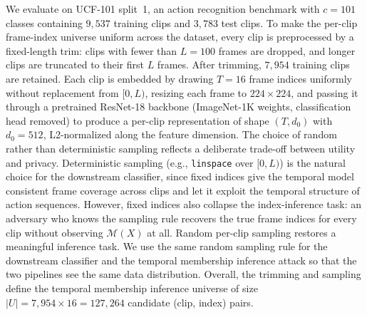 \documentclass[letterpaper]{article} %
\begin{document}
We evaluate on UCF-101 split~1, an action recognition benchmark with $c = 101$ classes containing $9{,}537$ training clips and $3{,}783$ test clips. To make the per-clip frame-index universe uniform across the dataset, every clip is preprocessed by a fixed-length trim: clips with fewer than $L = 100$ frames are dropped, and longer clips are truncated to their first $L$ frames. After trimming, $7{,}954$ training clips are retained.  Each clip is embedded by drawing $T = 16$ frame indices uniformly without replacement from $[0, L)$, resizing each frame to $224 \times 224$, and passing it through a pretrained ResNet-18 backbone (ImageNet-1K weights, classification head removed) to produce a per-clip representation of shape $(T, d_0)$ with $d_0 = 512$, L2-normalized along the feature dimension. The choice of random rather than deterministic sampling reflects a deliberate trade-off between utility and privacy. Deterministic sampling (e.g., \texttt{linspace} over $[0, L)$) is the natural choice for the downstream classifier, since fixed indices give the temporal model consistent frame coverage across clips and let it exploit the temporal structure of action sequences. However, fixed indices also collapse the index-inference task: an adversary who knows the sampling rule recovers the true frame indices for every clip without observing $\mathcal{M}(X)$ at all. Random per-clip sampling restores a meaningful inference task. We use the same random sampling rule for the downstream classifier and the temporal membership inference attack so that the two pipelines see the same data distribution. Overall, the trimming and sampling define the temporal membership inference universe of size $|U| = 7{,}954 \times 16 = 127{,}264$ candidate (clip, index) pairs.
\end{document}
